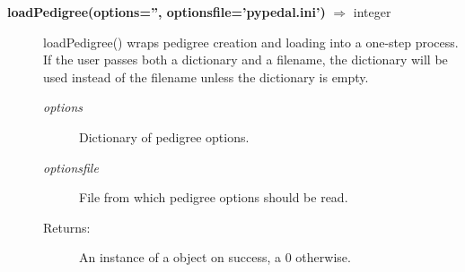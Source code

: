\begin{description}
\item[\textbf{loadPedigree(options='', optionsfile='pypedal.ini')} $\Rightarrow$ integer]
loadPedigree() wraps pedigree creation and loading into a one-step process.  If the user passes both a dictionary and a filename, the dictionary will be used instead of the filename unless the dictionary is empty.
\begin{description}
\item[\emph{options}] Dictionary of pedigree options.
\item[\emph{optionsfile}] File from which pedigree options should be read.
\item[Returns:] An instance of a  object on success, a 0 otherwise.
\end{description}

\end{description}

